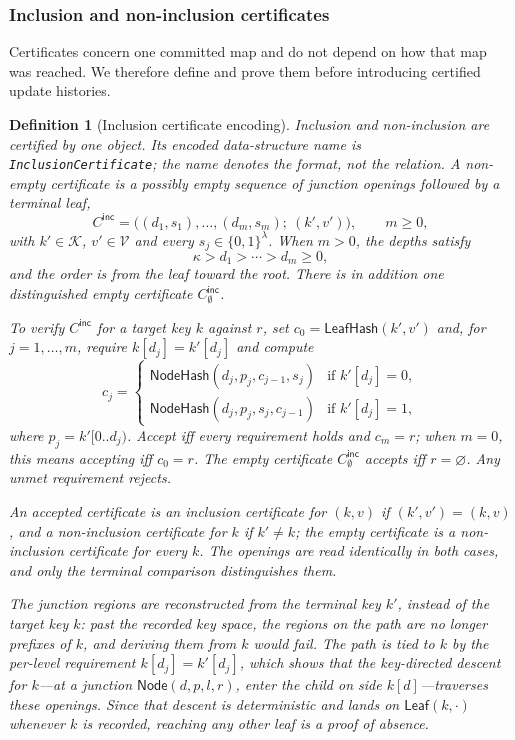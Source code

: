 \documentclass[11pt]{article}
\newtheorem{definition}{Definition}
\begin{document}
\subsubsection{Inclusion and non-inclusion certificates}

Certificates concern one committed map and do not depend on how that map was reached. We therefore define and prove them before introducing certified update histories.

\begin{definition}[Inclusion certificate encoding]
\label{def:inclusion-cert}
Inclusion and non-inclusion are certified by one object. Its encoded data-structure name is \texttt{InclusionCertificate}; the name denotes the format, not the relation. A non-empty certificate is a possibly empty sequence of junction openings followed by a terminal leaf,
\[
  C^\mathsf{inc}=\big((d_1,s_1),\ldots,(d_m,s_m);\ (k',v')\big), \qquad m\geq 0,
\]
with $k'\in\mathcal{K}$, $v'\in\mathcal{V}$ and every $s_j\in\{0,1\}^{\lambda}$. When $m>0$, the depths satisfy
\[
  \kappa>d_1>\cdots>d_m\geq 0,
\]
and the order is from the leaf toward the root. There is in addition one distinguished empty certificate $C^\mathsf{inc}_\emptyset$.

To verify $C^\mathsf{inc}$ for a target key $k$ against $r$, set $c_0=\mathsf{LeafHash}(k',v')$ and, for $j=1,\ldots,m$, require $k[d_j]=k'[d_j]$ and compute
\[
c_j = \begin{cases}
\mathsf{NodeHash}(d_j,p_j,c_{j-1},s_j) & \text{if } k'[d_j] = 0,\\
\mathsf{NodeHash}(d_j,p_j,s_j,c_{j-1}) & \text{if } k'[d_j] = 1,
\end{cases}
\]
where $p_j=k'[0..d_j)$. Accept iff every requirement holds and $c_m=r$; when $m=0$, this means accepting iff $c_0=r$. The empty certificate $C^\mathsf{inc}_\emptyset$ accepts iff $r=\varnothing$. Any unmet requirement rejects.

An accepted certificate is an \emph{inclusion certificate} for $(k,v)$ if $(k',v')=(k,v)$, and a \emph{non-inclusion certificate} for $k$ if $k'\neq k$; the empty certificate is a non-inclusion certificate for every $k$. The openings are read identically in both cases, and only the terminal comparison distinguishes them.

The junction regions are reconstructed from the \emph{terminal} key $k'$, instead of the target key $k$: past the recorded key space, the regions on the path are no longer prefixes of $k$, and deriving them from $k$ would fail. The path is tied to $k$ by the per-level requirement $k[d_j]=k'[d_j]$, which shows that the key-directed descent for $k$---at a junction $\mathsf{Node}(d,p,l,r)$, enter the child on side $k[d]$---traverses these openings. Since that descent is deterministic and lands on $\mathsf{Leaf}(k,\cdot)$ whenever $k$ is recorded, reaching any other leaf is a proof of absence.


\end{definition}
\end{document}
